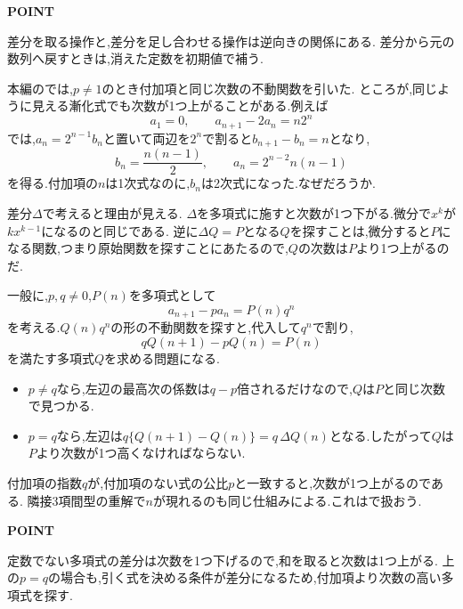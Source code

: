 \begin{bookpoint}
  \textbf{POINT}\par
  差分を取る操作と,差分を足し合わせる操作は逆向きの関係にある.
  差分から元の数列へ戻すときは,消えた定数を初期値で補う.
\end{bookpoint}

\label{節：付加項の次数が上がる理由}
本編のでは,$p\ne1$のとき付加項と同じ次数の不動関数を引いた.
ところが,同じように見える漸化式でも次数が1つ上がることがある.例えば
\[
  a_1=0,\qquad a_{n+1}-2a_n=n2^n
\]
では,$a_n=2^{n-1}b_n$と置いて両辺を$2^n$で割ると$b_{n+1}-b_n=n$となり,
\[
  b_n=\frac{n(n-1)}{2},\qquad a_n=2^{n-2}n(n-1)
\]
を得る.付加項の$n$は1次式なのに,$b_n$は2次式になった.なぜだろうか.

差分$\Delta$で考えると理由が見える.
$\Delta$を多項式に施すと次数が1つ下がる.微分で$x^k$が$kx^{k-1}$になるのと同じである.
逆に$\Delta Q=P$となる$Q$を探すことは,微分すると$P$になる関数,つまり原始関数を探すことにあたるので,$Q$の次数は$P$より1つ上がるのだ.

一般に,$p,q\ne0$,$P(n)$を多項式として
\[
  a_{n+1}-pa_n=P(n)q^n
\]
を考える.$Q(n)q^n$の形の不動関数を探すと,代入して$q^n$で割り,
\[
  qQ(n+1)-pQ(n)=P(n)
\]
を満たす多項式$Q$を求める問題になる.
\begin{itemize}
  \item $p\ne q$なら,左辺の最高次の係数は$q-p$倍されるだけなので,$Q$は$P$と同じ次数で見つかる.
  \item $p=q$なら,左辺は$q\{Q(n+1)-Q(n)\}=q\,\Delta Q(n)$となる.したがって$Q$は$P$より次数が1つ高くなければならない.
\end{itemize}
付加項の指数$q$が,付加項のない式の公比$p$と一致すると,次数が1つ上がるのである.
隣接3項間型の重解で$n$が現れるのも同じ仕組みによる.これはで扱おう.

\begin{bookpoint}
  \textbf{POINT}\par
  定数でない多項式の差分は次数を1つ下げるので,和を取ると次数は1つ上がる.
  上の$p=q$の場合も,引く式を決める条件が差分になるため,付加項より次数の高い多項式を探す.
\end{bookpoint}






